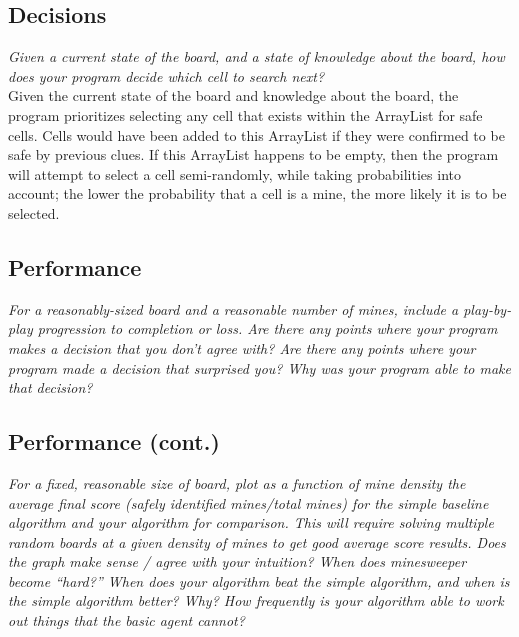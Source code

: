 \documentclass[11pt]{article} %
\begin{document}
\subsection{Decisions}

\textit{Given a current state of the board, and a state of knowledge about the board, how does your program decide which cell to search next?}\\

Given the current state of the board and knowledge about the board, the program prioritizes selecting any cell that exists within the ArrayList for safe cells. Cells would have been added to this ArrayList if they were confirmed to be safe by previous clues. If this ArrayList happens to be empty, then the program will attempt to select a cell semi-randomly, while taking probabilities into account; the lower the probability that a cell is a mine, the more likely it is to be selected. 

\subsection{Performance}

\textit{For a reasonably-sized board and a reasonable number of mines, include a play-by-play progression to completion or loss. Are there any points where your program makes a decision that you don’t agree with? Are there any points where your program made a decision that surprised you? Why was your program able to make that decision?}\\

\subsection{Performance (cont.)}

\textit{For a fixed, reasonable size of board, plot as a function of mine density the average final score (safely identified mines/total mines) for the simple baseline algorithm and your algorithm for comparison. This will require solving multiple random boards at a given density of mines to get good average score results. Does the graph make sense / agree with your intuition? When does minesweeper become “hard?” When does your algorithm beat the simple algorithm, and when is the simple algorithm better? Why? How frequently is your algorithm able to work out things that the basic agent cannot?}\\
\end{document}
